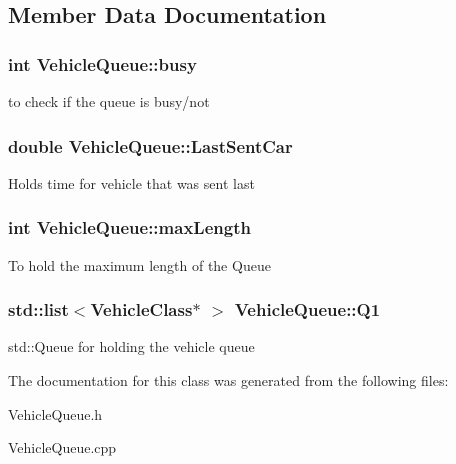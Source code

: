 \subsection{Member Data Documentation}
\hypertarget{class_vehicle_queue_a4ce16496b3665d0b91a8b5baf158c3a3}{
\subsubsection[{busy}]{\setlength{\rightskip}{0pt plus 5cm}int Vehicle\-Queue\-::busy}}\label{class_vehicle_queue_a4ce16496b3665d0b91a8b5baf158c3a3}
to check if the queue is busy/not \hypertarget{class_vehicle_queue_a329310055fa8fd635fd6740a8400b88d}{
\subsubsection[{Last\-Sent\-Car}]{\setlength{\rightskip}{0pt plus 5cm}double Vehicle\-Queue\-::\-Last\-Sent\-Car}}\label{class_vehicle_queue_a329310055fa8fd635fd6740a8400b88d}
Holds time for vehicle that was sent last \hypertarget{class_vehicle_queue_a8634f859977fc6937f91abc302d56318}{
\subsubsection[{max\-Length}]{\setlength{\rightskip}{0pt plus 5cm}int Vehicle\-Queue\-::max\-Length}}\label{class_vehicle_queue_a8634f859977fc6937f91abc302d56318}
To hold the maximum length of the Queue \hypertarget{class_vehicle_queue_aabc389fa6c347740a30453aced66009c}{
\subsubsection[{Q1}]{\setlength{\rightskip}{0pt plus 5cm}std\-::list$<${\bf Vehicle\-Class}$\ast$ $>$ Vehicle\-Queue\-::\-Q1}}\label{class_vehicle_queue_aabc389fa6c347740a30453aced66009c}
std\-::\-Queue for holding the vehicle queue 

The documentation for this class was generated from the following files\-:\begin{DoxyCompactItemize}
\item 
Vehicle\-Queue.\-h\item 
Vehicle\-Queue.\-cpp\end{DoxyCompactItemize}

